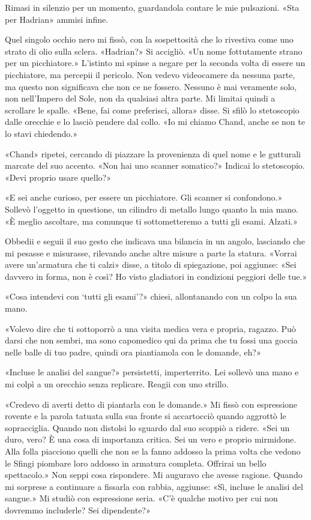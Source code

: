 Rimasi in silenzio per un momento, guardandola contare le mie
pulsazioni. «Sta per Hadrian» ammisi infine.

Quel singolo occhio nero mi fissò, con la sospettosità che lo rivestiva
come uno strato di olio sulla sclera. «Hadrian?» Si accigliò. «Un nome
fottutamente strano per un picchiatore.» L'istinto mi spinse a negare
per la seconda volta di essere un picchiatore, ma percepii il pericolo.
Non vedevo videocamere da nessuna parte, ma questo non significava che
non ce ne fossero. Nessuno è mai veramente solo, non nell'Impero del
Sole, non da qualsiasi altra parte. Mi limitai quindi a scrollare le
spalle. «Bene, fai come preferisci, allora» disse. Si sfilò lo
stetoscopio dalle orecchie e lo lasciò pendere dal collo. «Io mi chiamo
Chand, anche se non te lo stavi chiedendo.»

«Chand» ripetei, cercando di piazzare la provenienza di quel nome e le
gutturali marcate del suo accento. «Non hai uno scanner somatico?»
Indicai lo stetoscopio. «Devi proprio usare quello?»

«E sei anche curioso, per essere un picchiatore. Gli scanner si
confondono.» Sollevò l'oggetto in questione, un cilindro di metallo
lungo quanto la mia mano. «È meglio ascoltare, ma comunque ti
sottometteremo a tutti gli esami. Alzati.»

Obbedii e seguii il suo gesto che indicava una bilancia in un angolo,
lasciando che mi pesasse e misurasse, rilevando anche altre misure a
parte la statura. «Vorrai avere un'armatura che ti calzi» disse, a
titolo di spiegazione, poi aggiunse: «Sei davvero in forma, non è così?
Ho visto gladiatori in condizioni peggiori delle tue.»

«Cosa intendevi con `tutti gli esami'?» chiesi, allontanando con un
colpo la sua mano.

«Volevo dire che ti sottoporrò a una visita medica vera e propria,
ragazzo. Può darsi che non sembri, ma sono capomedico qui da prima che
tu fossi una goccia nelle balle di tuo padre, quindi ora piantiamola con
le domande, eh?»

«Incluse le analisi del sangue?» persistetti, imperterrito. Lei sollevò
una mano e mi colpì a un orecchio senza replicare. Reagii con uno
strillo.

«Credevo di averti detto di piantarla con le domande.» Mi fissò con
espressione rovente e la parola tatuata sulla sua fronte si accartocciò
quando aggrottò le sopracciglia. Quando non distolsi lo sguardo dal suo
scoppiò a ridere. «Sei un duro, vero? È una cosa di importanza critica.
Sei un vero e proprio mirmidone. Alla folla piacciono quelli che non se
la fanno addosso la prima volta che vedono le Sfingi piombare loro
addosso in armatura completa. Offrirai un bello spettacolo.» Non seppi
cosa rispondere. Mi auguravo che avesse ragione. Quando mi sorprese a
continuare a fissarla con rabbia, aggiunse: «Sì, incluse le analisi del
sangue.» Mi studiò con espressione seria. «C'è qualche motivo per cui
non dovremmo includerle? Sei dipendente?»


